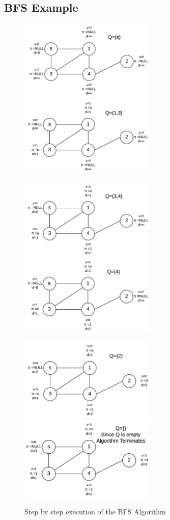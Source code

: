 \documentclass[12pt,letterpaper]{article}
\begin{document}
\subsection{BFS Example}
\begin{figure}[h]
\centering
\includegraphics[width=6.5cm]{bfs0}
\includegraphics[width=6.5cm]{bfs1}
\end{figure}
\begin{figure}[h]
\centering
\includegraphics[width=6.5cm]{bfs2}
\includegraphics[width=6.5cm]{bfs3}
\end{figure}
\begin{figure}[h]
\centering
\includegraphics[width=6.5cm]{bfs4}
\includegraphics[width=6.5cm]{bfs5}
\caption{Step by step execution of the BFS Algorithm}
\end{figure}
\end{document}
